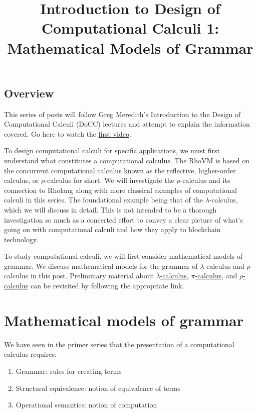 \documentclass[12pt]{article}
\numberwithin{equation}{section}
\begin{document}
\author{}
\date{}
\title{Introduction to Design of Computational Calculi 1: Mathematical Models of Grammar}

\maketitle

\subsection{Overview}
This series of posts will follow Greg Meredith's Introduction to the Design of Computational Calculi (DoCC) lectures and attempt to explain the information covered. Go here to watch the \href{https://www.youtube.com/watch?v=50z-TP0_HEA&list=PLf2bbiic5ZjD3q67melAFj8UWUFZy4PKP}{first video}.

To design computational calculi for specific applications, we must first understand what constitutes a computational calculus. The RhoVM is based on the concurrent computational calculus known as the reflective, higher-order calculus, or $\rho$-calculus for short. We will investigate the $\rho$-calculus and its connection to Rholang along with more classical examples of computational calculi in this series. The foundational example being that of the $\lambda$-calculus, which we will discuss in detail. This is not intended to be a thorough investigation so much as a concerted effort to convey a clear picture of what's going on with computational calculi and how they apply to blockchain technology.

To study computational calculi, we will first consider mathematical models of grammar. We discuss mathematical models for the grammar of $\lambda$-calculus and $\rho$-calculus in this post. Preliminary material about \href{https://blog.rchain.coop/computational-calculi-primer/}{$\lambda$-calculus}, \href{https://blog.rchain.coop/calculus-primer-\%cf\%80-calculus/}{$\pi$-calculus}, and \href{https://blog.rchain.coop/calculus-primer-\%cf\%81-calculus/}{$\rho$-calculus} can be revisited by following the appropriate link.

\section{Mathematical models of grammar}
We have seen in the primer series that the presentation of a computational calculus requires:
\begin{enumerate}
\item Grammar: rules for creating terms

\item Structural equivalence: notion of equivalence of terms

\item Operational semantics: notion of computation
\end{enumerate}
\end{document}
